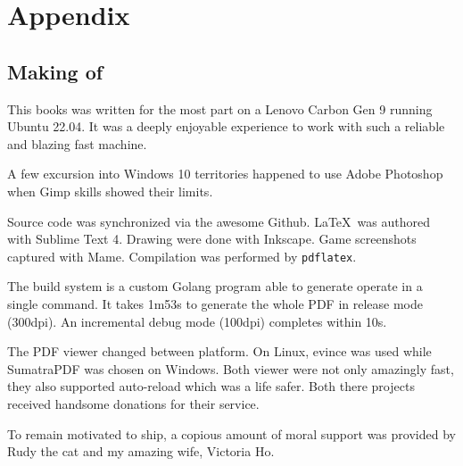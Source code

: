 \chapter{Appendix} 

\section{Making of}

This books was written for the most part on a Lenovo Carbon Gen 9 running Ubuntu 22.04. It was a deeply enjoyable experience to work with such a reliable and blazing fast machine. 


A few excursion into Windows 10 territories happened to use Adobe Photoshop when Gimp skills showed their limits. 

Source code was synchronized via the awesome Github. \LaTeX\ was authored with Sublime Text 4. Drawing were done with Inkscape. Game screenshots captured with Mame. Compilation was performed by \texttt{pdflatex}.

The build system is a custom Golang program able to generate operate in a single  command. It takes 1m53s to generate the whole PDF in release mode (300dpi). An incremental debug mode (100dpi) completes within 10s. 

The PDF viewer changed between platform. On Linux, evince was used while SumatraPDF was chosen on Windows. Both viewer were not only amazingly fast, they also supported auto-reload which was a life safer. Both there projects received handsome donations for their service.

To remain motivated to ship, a copious amount of moral support was provided by Rudy the cat and my amazing wife, Victoria Ho.
